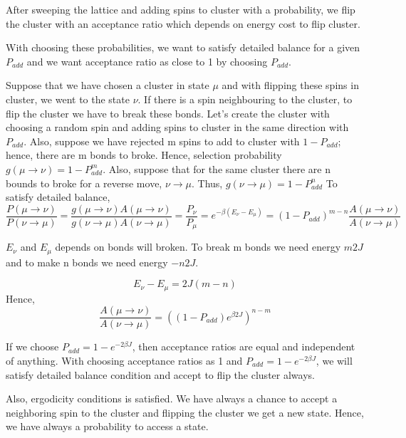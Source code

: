 \documentclass[12pt,fleqn]{report}
\begin{document}
After sweeping the lattice and adding spins to cluster with a probability, we 
flip the cluster with an acceptance ratio which depends on energy cost to 
flip cluster.

With choosing these probabilities, we want to satisfy detailed balance for a 
given $P_{add}$ and we want acceptance ratio as close to 1 by choosing 
$P_{add}$.

Suppose that we have chosen a cluster in state $\mu$ and with flipping 
these spins in cluster, we went to the state $\nu$. If there is a spin 
neighbouring to the cluster, to flip the cluster we have to break these 
bonds. Let's create the cluster with choosing a random spin and adding 
spins to cluster in the same direction with $P_{add}$. Also, suppose we 
have rejected m spins to add to cluster with $1- P_{add}$; hence, there are 
m bonds to broke. Hence, selection probability $g(\mu \rightarrow \nu) = 
1-P_{add}^m$. Also, suppose that for the same cluster there are n bounds 
to broke for a reverse move, $\nu \rightarrow \mu$. Thus, $g(\nu 
\rightarrow \mu) = 1-P_{add}^n$
To satisfy detailed balance,
\begin{equation}
\frac{P(\mu \rightarrow \nu) }{P(\nu \rightarrow \mu) } = \frac{g(\mu 
\rightarrow \nu)A(\mu \rightarrow \nu)  }{g(\nu \rightarrow \mu) A(\nu 
\rightarrow \mu) } = \frac{P_\nu}{P_\mu} = e^{-\beta(E_\nu - E_\mu)} = 
(1- P_{add})^{m-n} \frac{A(\mu \rightarrow \nu) }{A(\nu \rightarrow \mu) }
\end{equation}

$E_\nu $ and $E_\mu$ depends on bonds will broken. To break m bonds 
we need energy $m2J$ and to make n bonds we need energy $-n2J$. 

\begin{equation}
E_\nu - E_\mu = 2J(m-n)
\end{equation}
Hence,
\begin{equation}
\frac{A(\mu \rightarrow \nu)}{A(\nu \rightarrow \mu) } = ((1- 
P_{add})e^{\beta 2J})^{n-m}  
\end{equation}

If we choose $P_{add} = 1 - e^{-2\beta J}$, then acceptance ratios are 
equal and independent of anything. With choosing acceptance ratios as 1 
and $P_{add} = 1 - e^{-2 \beta J}$, we will satisfy detailed balance 
condition and accept to flip the cluster always. 

Also, ergodicity conditions is satisfied. We have always a chance to accept a 
neighboring spin to the cluster and flipping the cluster we get a new state. 
Hence, we have always a probability to access a state. 
\end{document}

